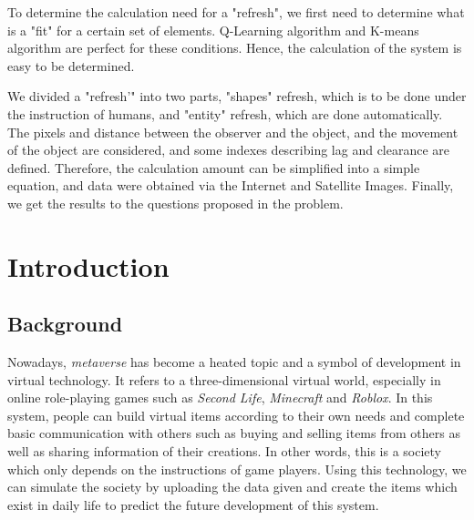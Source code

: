 \documentclass[12pt]{article}
\theoremstyle{definition}
\theoremstyle{remark}
\numberwithin{equation}{section}
\begin{document}
	To determine the calculation need for a "refresh", we first need to determine what is a "fit" for a certain set of elements. Q-Learning algorithm and K-means algorithm are perfect for these conditions. Hence, the calculation of the system is easy to be determined.
	
	We divided a "refresh’" into two parts, "shapes" refresh, which is to be done under the instruction of humans, and "entity" refresh, which are done automatically. The pixels and distance between the observer and the object, and the movement of the object are considered, and some indexes describing lag and clearance are defined. Therefore, the calculation amount can be simplified into a simple equation, and data were obtained via the Internet and Satellite Images. Finally, we get the results to the questions proposed in the problem.
	
	\thispagestyle{empty}
	\maketitle
	\thispagestyle{empty}
	\newpage
	\clearpage
	\thispagestyle{empty}
	\tableofcontents %
	\newpage
	\pagestyle{fancy}
	\setcounter{page}{1}
	
	\newpage
	\section{Introduction}
	\subsection{Background}
		Nowadays, \textit{metaverse} has become a heated topic and a symbol of development in virtual technology. It refers to a three-dimensional virtual world, especially in online role-playing games such as \textit{Second Life}, \textit{Minecraft} and \textit{Roblox}. In this system, people can build virtual items according to their own needs and complete basic communication with others such as buying and selling items from others as well as sharing information of their creations. In other words, this is a society which only depends on the instructions of game players. Using this technology, we can simulate the society by uploading the data given and create the items which exist in daily life to predict the future development of this system.
		
\end{document}
